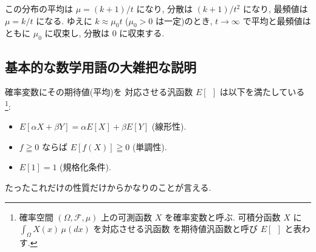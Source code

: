 \documentclass[12pt,twoside]{jarticle}
\theoremstyle{jplain}
\theoremstyle{jplain}
\theoremstyle{jplain}
\numberwithin{theorem}{section}
\numberwithin{equation}{section}
\numberwithin{figure}{section}
\numberwithin{table}{section}
\begin{document}
この分布の平均は $\mu=(k+1)/t$ になり, 
分散は $(k+1)/t^2$ になり, 
最頻値は $\mu=k/t$ になる.
ゆえに $k\approx \mu_0 t$ ($\mu_0>0$ は一定)のとき,
$t\to\infty$ で平均と最頻値はともに $\mu_0$ に収束し, 
分散は $0$ に収束する.


%
%
%


\subsection{基本的な数学用語の大雑把な説明}

確率変数にその期待値(平均)を
対応させる汎函数 $E[\ \ ]$ は以下を満たしている%
\footnote{確率空間 $(\Omega,\mathcal{F},\mu)$ 上の可測函数 $X$ を確率変数と呼ぶ. 
可積分函数 $X$ に $\int_\Omega X(x)\,\mu(dx)$ を対応させる汎函数
を期待値汎函数と呼び $E[\ \ ]$ と表わす.}:
\begin{itemize}
\item $E[\alpha X+\beta Y]=\alpha E[X]+\beta E[Y]$ (線形性).
\item $f\geqq 0$ ならば $E[f(X)]\geqq 0$ (単調性).
\item $E[1]=1$ (規格化条件).
\end{itemize}
たったこれだけの性質だけからかなりのことが言える.
\end{document}
